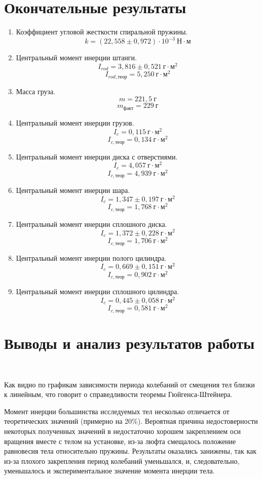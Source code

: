 \documentclass[a4paper,14pt]{article}
\begin{document}
\section{Окончательные результаты}

\begin{enumerate}
	\item Коэффициент угловой жесткости спиральной пружины.
	\[k = (22,558 \pm 0,972)\cdot 10^{-3} \ \text{Н}\cdot\text{м}\]
	\item Центральный момент инерции штанги.
	\[I_{rod} = 3,816 \pm 0,521 \ \text{г}\cdot\text{м}^2\]
	\[I_{rod, \text{теор}} = 5,250 \ \text{г}\cdot\text{м}^2\]
	\item Масса груза.
	\[m = 221,5 \ \text{г}\]
	\[m_{факт} = 229 \ \text{г}\]
	\item Центральный момент инерции грузов.
	\[I_{c} = 0,115 \ \text{г}\cdot\text{м}^2\]
	\[I_{c, \text{теор}} = 0,134 \ \text{г}\cdot\text{м}^2\]
	\item Центральный момент инерции диска с отверстиями.
	\[I_{c} = 4,057 \ \text{г}\cdot\text{м}^2\]
	\[I_{c, \text{теор}} = 4,939 \ \text{г}\cdot\text{м}^2\]
	\item Центральный момент инерции шара.
	\[I_{c} = 1,347 \pm 0,197 \ \text{г}\cdot\text{м}^2\]
	\[I_{c, \text{теор}} = 1,768 \ \text{г}\cdot\text{м}^2\]
	\item Центральный момент инерции сплошного диска.
	\[I_{c} = 1,372 \pm 0,228 \ \text{г}\cdot\text{м}^2\]
	\[I_{c, \text{теор}} = 1,706 \ \text{г}\cdot\text{м}^2\]
	\item Центральный момент инерции полого цилиндра.
	 \[I_{c} = 0,669 \pm 0,151 \ \text{г}\cdot\text{м}^2\]
	 \[I_{c, \text{теор}} = 0,902 \ \text{г}\cdot\text{м}^2\]
	\item Центральный момент инерции сплошного цилиндра. 
	\[I_{c} = 0,445 \pm 0,058 \ \text{г}\cdot\text{м}^2\]
	\[I_{c, \text{теор}} = 0,581 \ \text{г}\cdot\text{м}^2\]
\end{enumerate}


\section{Выводы и анализ результатов работы}

~

Как видно по графикам зависимости периода колебаний от смещения тел близки к линейным, что говорит о справедливости теоремы Гюйгенса-Штейнера.

Момент инерции большинства исследуемых тел несколько отличается от теоретических значений (примерно на 20\%).
Вероятная причина недостоверности некоторых полученных значений в недостаточно хорошем закреплением оси вращения вместе с телом на установке, из-за люфта смещалось положение равновесия тела относительно пружины.
Результаты оказались занижены, так как из-за плохого закрепления период колебаний уменьшался, и, следовательно, уменьшалось и экспериментальное значение момента инерции тела.
\end{document}
